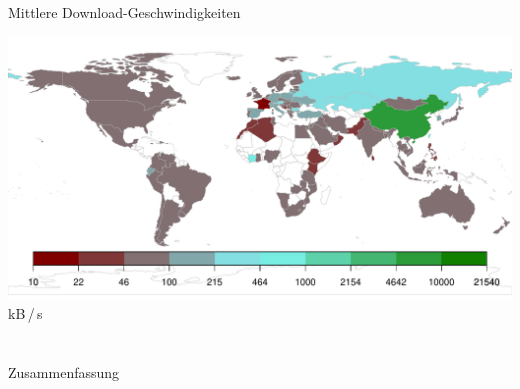 \documentclass[dvipsnames]{beamer} %
\begin{document}
	\begin{frame}{Mittlere Download-Geschwindigkeiten}
		\begin{center}
	    \includegraphics[width=\textwidth]{../result/2015-08-30_20-combined_speed_map}\\
	    {\small kB\,/\,s}
	  \end{center}
	\end{frame}

	\section{}
	\begin{frame}{Zusammenfassung}
		\tableofcontents
	\end{frame}
\end{document}
